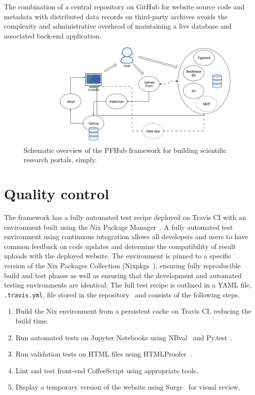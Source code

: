 \documentclass{jors}
\begin{document}
The combination of a central repository on GitHub for website source
code and metadata with distributed data records on third-party
archives avoids the complexity and administrative overhead of
maintaining a live database and associated back-end application.

\begin{figure}
  \includegraphics[width=\textwidth]{pfhub_website.png}
  \caption{Schematic overview of the PFHub framework for building
    scientific research portals, simply.}
  \centering
  \label{fig:pfhub_website}
\end{figure}

\section*{Quality control}

The framework has a fully automated test recipe deployed on Travis CI
with an environment built using the Nix Package Manager~\cite{nix}. A
fully automated test environment using continuous integration allows
all developers and users to have common feedback on code updates and
determine the compatibility of result uploads with the deployed
website. The environment is pinned to a specific version of the Nix
Packages Collection (Nixpkgs~\cite{nixpkgs}), ensuring fully
reproducible build and test phases as well as ensuring that the
development and automated testing environments are identical. The full
test recipe is outlined in a YAML file, \texttt{.travis.yml}, file
stored in the repository~\cite{travisyml} and consists of the
following steps.

\begin{enumerate}
  \item Build the Nix environment from a persistent cache on Travis
    CI, reducing the build time.
  \item Run automated tests on Jupyter Notebooks using
    NBval~\cite{nbval} and Py.test~\cite{pytest}.
  \item Run validation tests on HTML files using
    HTMLProofer~\cite{htmlproofer}.
  \item Lint and test front-end CoffeeScript using appropriate tools.
  \item Display a temporary version of the website using
    Surge~\cite{surge} for visual review.
\end{enumerate}
\end{document}
